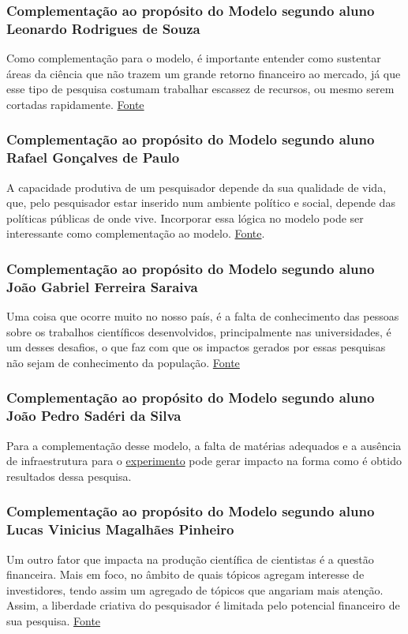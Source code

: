 \subsubsection{Complementação ao propósito do Modelo segundo aluno Leonardo Rodrigues de Souza}
Como complementação para o modelo, é importante entender como sustentar áreas da ciência que não trazem um grande retorno financeiro ao mercado, já que esse tipo de pesquisa costumam trabalhar escassez de recursos, ou mesmo serem cortadas rapidamente. \href{https://exame.com/ciencia/crise-na-ciencia-nao-se-deve-so-a-falta-de-recursos/}{Fonte}

\subsubsection{Complementação ao propósito do Modelo segundo aluno Rafael Gonçalves de Paulo}
A capacidade produtiva de um pesquisador depende da sua qualidade de vida, que, pelo pesquisador estar inserido num ambiente político e social, depende das políticas públicas de onde vive. Incorporar essa lógica no modelo pode ser interessante como complementação ao modelo. \href{https://www.revista.ueg.br/index.php/mirante/article/view/7103}{Fonte}.

\subsubsection{Complementação ao propósito do Modelo segundo aluno João Gabriel Ferreira Saraiva}
Uma coisa que ocorre muito no nosso país, é a falta de conhecimento das pessoas sobre os trabalhos científicos desenvolvidos, principalmente nas universidades, é um desses desafios, o que faz com que os impactos gerados por essas pesquisas não sejam de conhecimento da população. \href{https://www.periodicosdeminas.ufmg.br/entenda-os-atuais-desafios-das-pesquisas-cientificas/}{Fonte}

\subsubsection{Complementação ao propósito do Modelo segundo aluno João Pedro Sadéri da Silva}
Para a complementação desse modelo, a falta de matérias adequados e a ausência de infraestrutura para o \href{https://www.blogs.unicamp.br/socialmente/2011/08/23/o-que-e-e-para-que-serve-um-experimento/}{experimento} pode gerar impacto na forma como é obtido resultados dessa pesquisa.

\subsubsection{Complementação ao propósito do Modelo segundo aluno Lucas Vinicius Magalhães Pinheiro}
Um outro fator que impacta na produção científica de cientistas é a questão financeira. Mais em foco, no âmbito de quais tópicos agregam interesse de investidores, tendo assim um agregado de tópicos que angariam mais atenção. Assim, a liberdade criativa do pesquisador é limitada pelo potencial financeiro de sua pesquisa. \href{https://revistapesquisa.fapesp.br/conflito-de-interesses-um-desafio-inevitavel/}{Fonte}

